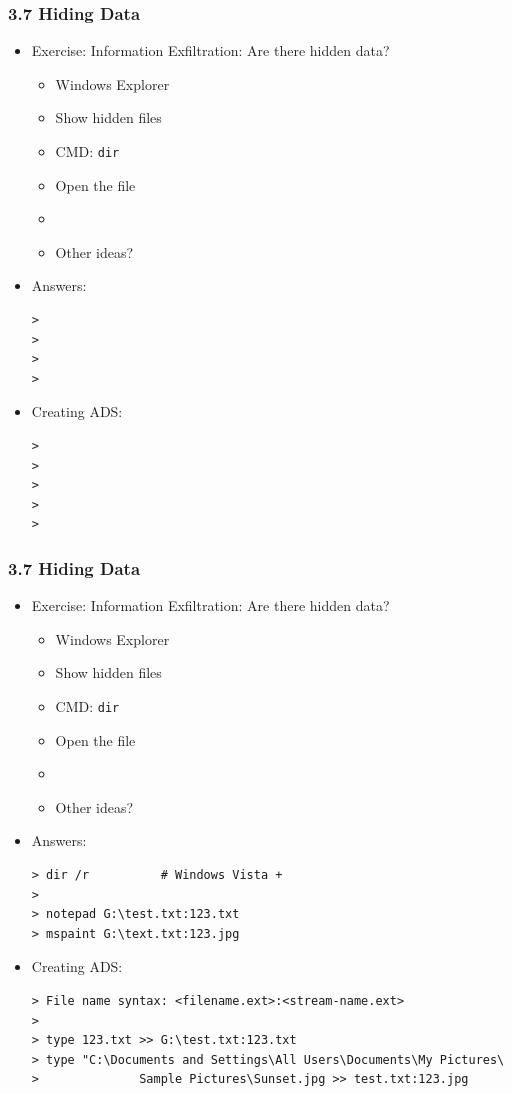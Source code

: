 \begin{frame}[fragile]
  \frametitle{3.7 Hiding Data}
    \begin{itemize}
       \item Exercise: Information Exfiltration: Are there hidden data?
            \begin{itemize}
                \item Windows Explorer
                \item Show hidden files
                \item CMD: \texttt{dir}
                \item Open the file
                \item
                \item Other ideas?
            \end{itemize}
       \item Answers:
  \begin{lstlisting}[basicstyle=\tiny]
>
>
>
>
  \end{lstlisting}
       \item Creating ADS:
  \begin{lstlisting}[basicstyle=\tiny]
>
>
>
>
>
  \end{lstlisting}
    \end{itemize}
\end{frame}


\begin{frame}[fragile]
  \frametitle{3.7 Hiding Data}
    \begin{itemize}
       \item Exercise: Information Exfiltration: Are there hidden data?
            \begin{itemize}
                \item Windows Explorer
                \item Show hidden files
                \item CMD: \texttt{dir}
                \item Open the file
                \item
                \item Other ideas?
            \end{itemize}
       \item Answers:
  \begin{lstlisting}[basicstyle=\tiny]
> dir /r          # Windows Vista +
>
> notepad G:\test.txt:123.txt
> mspaint G:\text.txt:123.jpg
  \end{lstlisting}
       \item Creating ADS:
  \begin{lstlisting}[basicstyle=\tiny]
> File name syntax: <filename.ext>:<stream-name.ext>
>
> type 123.txt >> G:\test.txt:123.txt
> type "C:\Documents and Settings\All Users\Documents\My Pictures\
>              Sample Pictures\Sunset.jpg >> test.txt:123.jpg
  \end{lstlisting}
    \end{itemize}
\end{frame}


